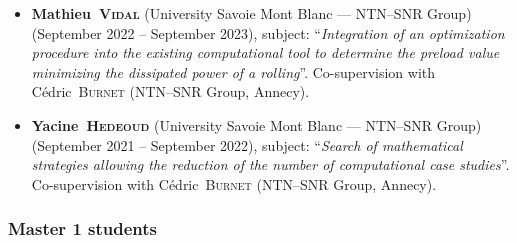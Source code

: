 \documentclass[final, a4paper, oneside, 12pt]{article}
\numberwithin{equation}{section}
\begin{document}
\begin{itemize}

  \item \textbf{Mathieu~\textsc{Vidal}} (University Savoie Mont Blanc --- NTN--SNR Group) (September 2022 -- September 2023), subject: ``\textit{Integration of an optimization procedure into the existing computational tool to determine the preload value minimizing the dissipated power of a rolling}''. Co-supervision with C\'edric~\textsc{Burnet} (NTN--SNR Group, Annecy).

  \item \textbf{Yacine~\textsc{Hedeoud}} (University Savoie Mont Blanc --- NTN--SNR Group) (September 2021 -- September 2022), subject: ``\textit{Search of mathematical strategies allowing the reduction of the number of computational case studies}''. Co-supervision with C\'edric~\textsc{Burnet} (NTN--SNR Group, Annecy).
  
\end{itemize}

\subsubsection{Master 1 students}
\end{document}
